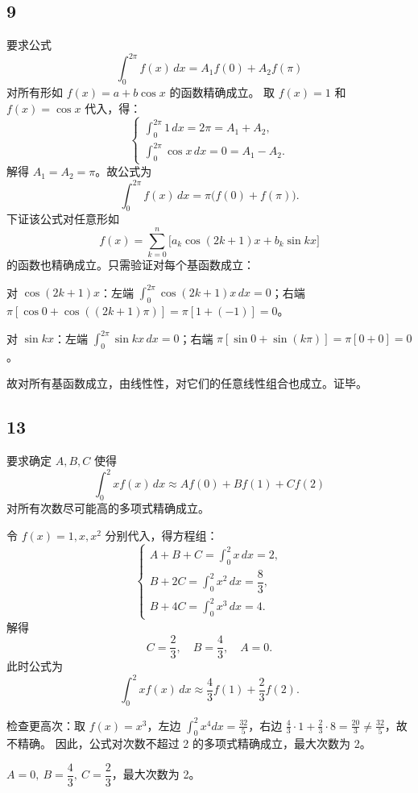 \documentclass{article}
\begin{document}
\subsection*{9}
要求公式  
\[
\int_0^{2\pi} f(x)\,dx = A_1 f(0) + A_2 f(\pi)
\]  
对所有形如 \( f(x) = a + b\cos x \) 的函数精确成立。  
取 \( f(x)=1 \) 和 \( f(x)=\cos x \) 代入，得：  
\[
\begin{cases}
\int_0^{2\pi} 1\,dx = 2\pi = A_1 + A_2, \\[4pt]
\int_0^{2\pi} \cos x\,dx = 0 = A_1 - A_2.
\end{cases}
\]  
解得 \( A_1 = A_2 = \pi \)。故公式为  
\[
\int_0^{2\pi} f(x)\,dx = \pi \bigl( f(0) + f(\pi) \bigr).
\]  
下证该公式对任意形如  
\[
f(x) = \sum_{k=0}^n \bigl[ a_k \cos(2k+1)x + b_k \sin kx \bigr]
\]  
的函数也精确成立。只需验证对每个基函数成立：

对 \(\cos(2k+1)x\)：左端 \(\int_0^{2\pi} \cos(2k+1)x\,dx = 0\)；右端 \(\pi[\cos0 + \cos((2k+1)\pi)] = \pi[1 + (-1)] = 0\)。  

对 \(\sin kx\)：左端 \(\int_0^{2\pi} \sin kx\,dx = 0\)；右端 \(\pi[\sin0 + \sin(k\pi)] = \pi[0+0] = 0\)。  

故对所有基函数成立，由线性性，对它们的任意线性组合也成立。证毕。
\subsection*{13}
  
要求确定 \(A, B, C\) 使得  
\[
\int_0^2 x f(x) \, dx \approx A f(0) + B f(1) + C f(2)
\]  
对所有次数尽可能高的多项式精确成立。  

令 \(f(x) = 1, x, x^2\) 分别代入，得方程组：  
\[
\begin{cases}
A + B + C = \int_0^2 x \, dx = 2, \\[4pt]
B + 2C = \int_0^2 x^2 \, dx = \dfrac{8}{3}, \\[4pt]
B + 4C = \int_0^2 x^3 \, dx = 4.
\end{cases}
\]  
解得  
\[
C = \frac{2}{3},\quad B = \frac{4}{3},\quad A = 0.
\]  
此时公式为  
\[
\int_0^2 x f(x) \, dx \approx \frac{4}{3} f(1) + \frac{2}{3} f(2).
\]  

检查更高次：取 \(f(x) = x^3\)，左边 \(\int_0^2 x^4 dx = \frac{32}{5}\)，右边 \(\frac{4}{3} \cdot 1 + \frac{2}{3} \cdot 8 = \frac{20}{3} \neq \frac{32}{5}\)，故不精确。  
因此，公式对次数不超过 2 的多项式精确成立，最大次数为 2。  

\(A = 0,\ B = \dfrac{4}{3},\ C = \dfrac{2}{3}\)，最大次数为 2。
\end{document}
